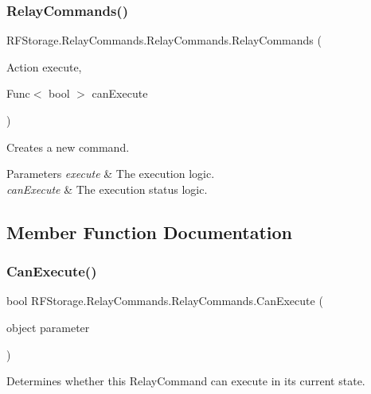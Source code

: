 \subsubsection{\texorpdfstring{RelayCommands()}{RelayCommands()}\hspace{0.1cm}{\footnotesize\ttfamily [2/2]}}
{\footnotesize\ttfamily R\+F\+Storage.\+Relay\+Commands.\+Relay\+Commands.\+Relay\+Commands (\begin{DoxyParamCaption}\item[{Action}]{execute,  }\item[{Func$<$ bool $>$}]{can\+Execute }\end{DoxyParamCaption})}



Creates a new command. 


\begin{DoxyParams}{Parameters}
{\em execute} & The execution logic.\\
\hline
{\em can\+Execute} & The execution status logic.\\
\hline
\end{DoxyParams}


\subsection{Member Function Documentation}
\mbox{\label{class_r_f_storage_1_1_relay_commands_1_1_relay_commands_a65a37e91e18d693a8445d4b6e34e1ce6}} 
\subsubsection{\texorpdfstring{CanExecute()}{CanExecute()}}
{\footnotesize\ttfamily bool R\+F\+Storage.\+Relay\+Commands.\+Relay\+Commands.\+Can\+Execute (\begin{DoxyParamCaption}\item[{object}]{parameter }\end{DoxyParamCaption})}



Determines whether this Relay\+Command can execute in its current state. 


